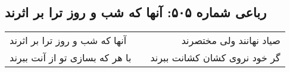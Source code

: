 \begin{center}
\section*{رباعی شماره ۵۰۵: آنها که شب و روز ترا بر اثرند}
\label{sec:0505}
\begin{longtable}{l p{0.5cm} r}
آنها که شب و روز ترا بر اثرند
&&
صیاد نهانند ولی مختصرند
\\
با هر که بسازی تو از آنت ببرند
&&
گر خود نروی کشان کشانت ببرند
\\
\end{longtable}
\end{center}
